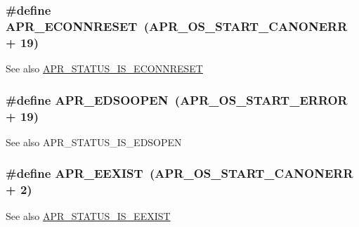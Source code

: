 \subsubsection[{\texorpdfstring{A\+P\+R\+\_\+\+E\+C\+O\+N\+N\+R\+E\+S\+ET}{APR_ECONNRESET}}]{\setlength{\rightskip}{0pt plus 5cm}\#define A\+P\+R\+\_\+\+E\+C\+O\+N\+N\+R\+E\+S\+ET~({\bf A\+P\+R\+\_\+\+O\+S\+\_\+\+S\+T\+A\+R\+T\+\_\+\+C\+A\+N\+O\+N\+E\+RR} + 19)}\hypertarget{group___a_p_r___error_ga264bfe2056e917728e9ed060b58869c2}{}\label{group___a_p_r___error_ga264bfe2056e917728e9ed060b58869c2}
\begin{DoxySeeAlso}{See also}
\hyperlink{group___a_p_r___s_t_a_t_u_s___i_s_ga866d4ddd8e32221fb547ad7c6ee87ac5}{A\+P\+R\+\_\+\+S\+T\+A\+T\+U\+S\+\_\+\+I\+S\+\_\+\+E\+C\+O\+N\+N\+R\+E\+S\+ET} 
\end{DoxySeeAlso}
\subsubsection[{\texorpdfstring{A\+P\+R\+\_\+\+E\+D\+S\+O\+O\+P\+EN}{APR_EDSOOPEN}}]{\setlength{\rightskip}{0pt plus 5cm}\#define A\+P\+R\+\_\+\+E\+D\+S\+O\+O\+P\+EN~({\bf A\+P\+R\+\_\+\+O\+S\+\_\+\+S\+T\+A\+R\+T\+\_\+\+E\+R\+R\+OR} + 19)}\hypertarget{group___a_p_r___error_gac96fbde76282364e8c482d6f23bc61bb}{}\label{group___a_p_r___error_gac96fbde76282364e8c482d6f23bc61bb}
\begin{DoxySeeAlso}{See also}
A\+P\+R\+\_\+\+S\+T\+A\+T\+U\+S\+\_\+\+I\+S\+\_\+\+E\+D\+S\+O\+P\+EN 
\end{DoxySeeAlso}
\subsubsection[{\texorpdfstring{A\+P\+R\+\_\+\+E\+E\+X\+I\+ST}{APR_EEXIST}}]{\setlength{\rightskip}{0pt plus 5cm}\#define A\+P\+R\+\_\+\+E\+E\+X\+I\+ST~({\bf A\+P\+R\+\_\+\+O\+S\+\_\+\+S\+T\+A\+R\+T\+\_\+\+C\+A\+N\+O\+N\+E\+RR} + 2)}\hypertarget{group___a_p_r___error_gafa7f353804388017a0ea71bc14f0dda5}{}\label{group___a_p_r___error_gafa7f353804388017a0ea71bc14f0dda5}
\begin{DoxySeeAlso}{See also}
\hyperlink{group___a_p_r___s_t_a_t_u_s___i_s_gacc75b742e893aa7db40a95bab53049da}{A\+P\+R\+\_\+\+S\+T\+A\+T\+U\+S\+\_\+\+I\+S\+\_\+\+E\+E\+X\+I\+ST} 
\end{DoxySeeAlso}
